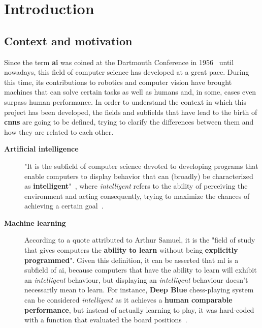 \chapter{Introduction}\label{ch:introduction}
\section{Context and motivation}
Since the term \textbf{\gls{ai}} was coined at the Dartmouth Conference in 1956~\cite{mccarthy2006proposal} until nowadays, this field of computer science has developed at a great pace. During this time, its contributions to robotics and computer vision have brought machines that can solve certain tasks as well as humans and, in some, cases even surpass human performance. In order to understand the context in which this project has been developed, the fields and subfields that have lead to the birth of \textbf{\glspl{cnn}} are going to be defined, trying to clarify the differences between them and how they are related to each other. 
\begin{description}
	\item[\textbf{Artificial intelligence}] "It is the subfield of computer science devoted to developing programs that enable computers to display behavior that can (broadly) be characterized as \textbf{intelligent}"~\cite{sep-logic-ai}, where \textit{intelligent} refers to the ability of perceiving the environment and acting consequently, trying to maximize the chances of achieving a certain goal~\cite{Russell:2003:AIM:773294}.
\end{description}
\begin{description}
	\item[\textbf{Machine learning}] According to a quote attributed to Arthur Samuel, it is the "field of study that gives computers the \textbf{ability to learn} without being \textbf{explicitly programmed}". Given this definition, it can be asserted that \gls{ml} is a subfield of \gls{ai}, because computers that have the ability to learn will exhibit an \textit{intelligent} behaviour, but displaying an \textit{intelligent} behaviour doesn't necessarily mean to learn. For instance, \textbf{Deep Blue} chess-playing system can be considered \textit{intelligent} as it achieves a \textbf{human comparable performance}, but instead of actually learning to play, it was hard-coded with a function that evaluated the board positions~\cite{Goodfellow-et-al-2016}.  
\end{description}

